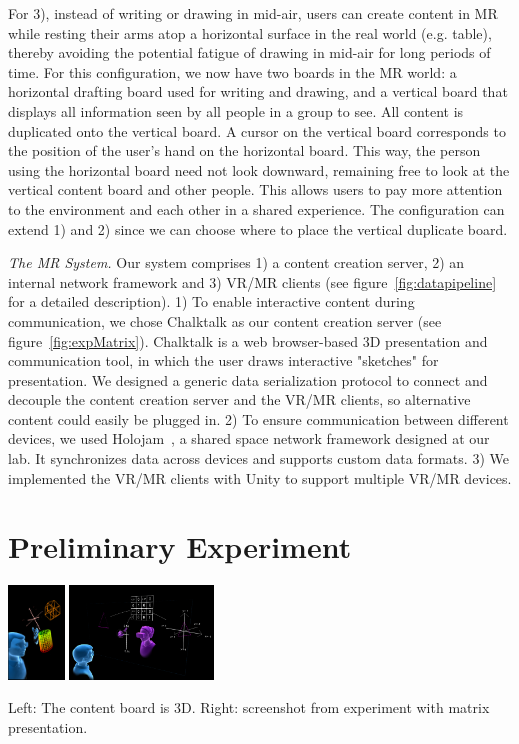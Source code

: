 \documentclass[sigchi-a]{acmart}
\begin{document}
For 3), instead of writing or drawing in mid-air, users can create content in MR
while resting their arms atop a horizontal surface in the real world (e.g. table), thereby avoiding the potential fatigue of drawing in mid-air for long periods of time. For this configuration, we now have two boards in the MR world: a horizontal drafting board used for writing and drawing, and a vertical board that displays all information seen by all people in a group to see. All content is duplicated onto the vertical board. A cursor on the vertical board corresponds to the position of the user's hand on the horizontal board. This way, the person using the horizontal board need not look downward, remaining free to look at the vertical content board and other people. This allows users to pay more attention to the environment and each other in a shared experience. The configuration can extend 1) and 2) since we can choose where to place the vertical duplicate board.

\textit{The MR System.} Our system comprises 1) a content creation server, 2) an internal network framework and 3) VR/MR clients (see figure~\ref{fig:datapipeline} for a detailed description). 1) To enable interactive content during communication, we chose Chalktalk as our content creation server (see figure~\ref{fig:expMatrix}). Chalktalk is a web browser-based 3D presentation and communication tool, 
in which the user draws interactive "sketches" for presentation. We designed a generic data serialization protocol to connect and decouple the content creation server and the VR/MR clients, so alternative content could easily be plugged in.
2) To ensure communication between different devices, we used Holojam~\cite{perlin2016future}, a shared space network framework designed at our lab.
It synchronizes data across devices and supports custom data formats.
3) We implemented the VR/MR clients with Unity to support multiple VR/MR devices.


\section{Preliminary Experiment}

\begin{marginfigure}
    \includegraphics[height = 2.5cm]{3d.png}
    \includegraphics[height = 2.5cm]{experimentMatrix.png}
    \caption{Left: The content board is 3D. Right: screenshot from experiment with matrix presentation.}
    \label{fig:expMatrix}
\end{marginfigure}
\end{document}
